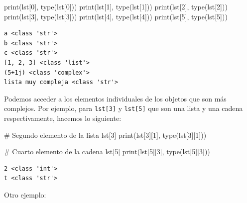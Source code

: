 \documentclass[
  spanish,
  letterpaper,
]{scrbook}
\newenvironment{Shaded}{\begin{snugshade}}{\end{snugshade}}
\newcommand{\BuiltInTok}[1]{\textcolor[rgb]{0.00,0.23,0.31}{#1}}
\newcommand{\CommentTok}[1]{\textcolor[rgb]{0.37,0.37,0.37}{#1}}
\newcommand{\DecValTok}[1]{\textcolor[rgb]{0.68,0.00,0.00}{#1}}
\newcommand{\NormalTok}[1]{\textcolor[rgb]{0.00,0.23,0.31}{#1}}
\theoremstyle{definition}
\theoremstyle{remark}
\begin{document}
\begin{Shaded}
\begin{Highlighting}[]
\BuiltInTok{print}\NormalTok{(lst[}\DecValTok{0}\NormalTok{], }\BuiltInTok{type}\NormalTok{(lst[}\DecValTok{0}\NormalTok{]))}
\BuiltInTok{print}\NormalTok{(lst[}\DecValTok{1}\NormalTok{], }\BuiltInTok{type}\NormalTok{(lst[}\DecValTok{1}\NormalTok{]))}
\BuiltInTok{print}\NormalTok{(lst[}\DecValTok{2}\NormalTok{], }\BuiltInTok{type}\NormalTok{(lst[}\DecValTok{2}\NormalTok{]))}
\BuiltInTok{print}\NormalTok{(lst[}\DecValTok{3}\NormalTok{], }\BuiltInTok{type}\NormalTok{(lst[}\DecValTok{3}\NormalTok{]))}
\BuiltInTok{print}\NormalTok{(lst[}\DecValTok{4}\NormalTok{], }\BuiltInTok{type}\NormalTok{(lst[}\DecValTok{4}\NormalTok{]))}
\BuiltInTok{print}\NormalTok{(lst[}\DecValTok{5}\NormalTok{], }\BuiltInTok{type}\NormalTok{(lst[}\DecValTok{5}\NormalTok{]))}
\end{Highlighting}
\end{Shaded}

\begin{verbatim}
a <class 'str'>
b <class 'str'>
c <class 'str'>
[1, 2, 3] <class 'list'>
(5+1j) <class 'complex'>
lista muy compleja <class 'str'>
\end{verbatim}

Podemos acceder a los elementos individuales de los objetos que son más
complejos. Por ejemplo, para \texttt{lst{[}3{]}} y \texttt{lst{[}5{]}}
que son una lista y una cadena respectivamente, hacemos lo siguiente:

\begin{Shaded}
\begin{Highlighting}[]
\CommentTok{\# Segundo elemento de la lista \textquotesingle{}lst[3]\textquotesingle{}}
\BuiltInTok{print}\NormalTok{(lst[}\DecValTok{3}\NormalTok{][}\DecValTok{1}\NormalTok{], }\BuiltInTok{type}\NormalTok{(lst[}\DecValTok{3}\NormalTok{][}\DecValTok{1}\NormalTok{]))}

\CommentTok{\# Cuarto elemento de la cadena \textquotesingle{}lst[5]\textquotesingle{}}
\BuiltInTok{print}\NormalTok{(lst[}\DecValTok{5}\NormalTok{][}\DecValTok{3}\NormalTok{], }\BuiltInTok{type}\NormalTok{(lst[}\DecValTok{5}\NormalTok{][}\DecValTok{3}\NormalTok{]))}
\end{Highlighting}
\end{Shaded}

\begin{verbatim}
2 <class 'int'>
t <class 'str'>
\end{verbatim}

Otro ejemplo:
\end{document}
